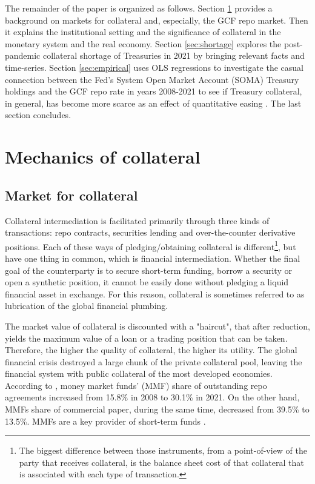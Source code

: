 \documentclass[11pt,a4paper,english,oneside]{article}
\begin{document}
The remainder of the paper is organized as follows. Section \ref{sec:mechanics} provides a background on markets for collateral and, especially, the GCF repo market. Then it explains the institutional setting and the significance of collateral in the monetary system and the real economy. Section \ref{sec:shortage} explores the post-pandemic collateral shortage of Treasuries in 2021 by bringing relevant facts and time-series. Section \ref{sec:empirical} uses OLS regressions to investigate the casual connection between the Fed's System Open Market Account (SOMA) Treasury holdings and the GCF repo rate in years 2008-2021 to see if Treasury collateral, in general, has become more scarce as an effect of quantitative easing . The last section concludes.

\newpage

\section{Mechanics of collateral} \label{sec:mechanics}

\subsection{Market for collateral}

Collateral intermediation is facilitated primarily through three kinds of transactions: repo contracts, securities lending and over-the-counter derivative positions. Each of these ways of pledging/obtaining collateral is different\footnote{The biggest difference between those instruments, from a point-of-view of the party that receives collateral, is the balance sheet cost of that collateral that is associated with each type of transaction.}, but have one thing in common, which is financial intermediation. Whether the final goal of the counterparty is to secure short-term funding, borrow a security or open a synthetic position, it cannot be easily done without pledging a liquid financial asset in exchange. For this reason, collateral is sometimes referred to as lubrication of the global financial plumbing.

The market value of collateral is discounted with a "haircut", that after reduction, yields the maximum value of a loan or a trading position that can be taken. Therefore, the higher the quality of collateral, the higher its utility. The global financial crisis destroyed a large chunk of the private collateral pool, leaving the financial system with public collateral of the most developed economies. According to \citet{ofr2021b}, money market funds' (MMF) share of outstanding repo agreements increased from 15.8\% in 2008 to 30.1\% in 2021. On the other hand, MMFs share of commercial paper, during the same time, decreased from 39.5\% to 13.5\%. MMFs are a key provider of short-term funds \citep{ofr2021}.
\end{document}
